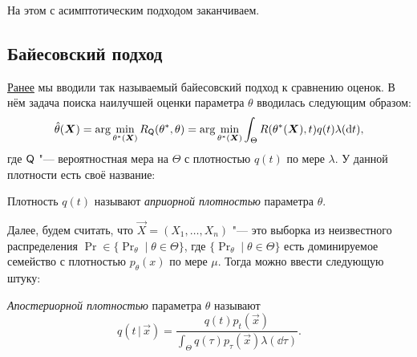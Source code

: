 На этом с асимптотическим подходом заканчиваем. 

\subsection{Байесовский подход}
\hyperref[lec2:bayes]{Ранее} мы вводили так называемый байесовский подход к сравнению оценок. В нём задача поиска наилучшей оценки параметра $\theta$ вводилась следующим образом:
\[
    \hat{\theta}(\bm{X}) 
    = \arg\min_{\theta^{*}(\bm{X})} R_{\mathsf{Q}}(\theta^{*}, \theta) 
    = \arg\min_{\theta^{*}(\bm{X})} \int_{\Theta} R(\theta^{*}(\bm{X}), t)q(t)\lambda(\dd t),
\]
где $\mathsf{Q}$ "--- вероятностная мера на $\Theta$ с плотностью $q(t)$ по мере $\lambda$. У данной плотности есть своё название:
\begin{definition}
    Плотность $q(t)$ называют \emph{априорной плотностью} параметра $\theta$.
\end{definition}
Далее, будем считать, что $\vec{X} = (X_{1}, \ldots, X_{n})$ "--- это выборка из неизвестного распределения $\Pr \in \{\Pr_{\theta} \mid \theta \in \Theta\}$, где $\{\Pr_{\theta} \mid \theta \in \Theta\}$ есть доминируемое семейство с плотностью $p_{\theta}(x)$ по мере $\mu$. Тогда можно ввести следующую штуку:
\begin{definition}
    \emph{Апостериорной плотностью} параметра $\theta$ называют
    \[
        q(t\,|\,\vec{x}) = \frac{q(t)p_{t}(\vec{x})}{\int_{\Theta} q(\tau)p_{\tau}(\vec{x})\lambda(\dd \tau)}.
    \]
\end{definition}

